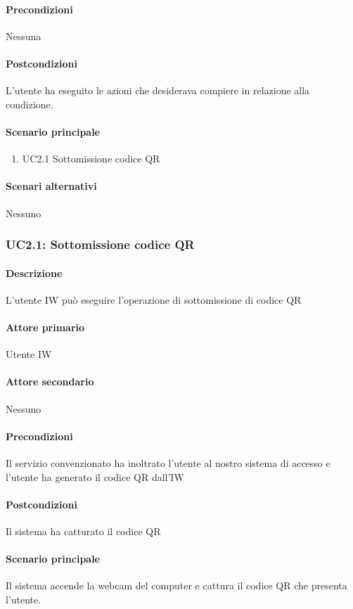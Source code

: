 \paragraph{Precondizioni} Nessuna
\paragraph{Postcondizioni}  L’utente ha eseguito le azioni che desiderava compiere in relazione alla condizione.
\paragraph{Scenario principale}  
    \begin{enumerate}
        \item UC2.1 Sottomissione codice QR
    \end{enumerate}
\paragraph{Scenari alternativi}  Nessuno






\subsubsection{UC2.1: Sottomissione codice QR}
\paragraph{Descrizione}  L’utente IW può eseguire l’operazione di sottomissione di codice QR
\paragraph{Attore primario}  Utente IW
\paragraph{Attore secondario}  Nessuno
\paragraph{Precondizioni} Il servizio convenzionato ha inoltrato l’utente al nostro sistema di accesso e l’utente ha generato il codice QR dall’IW
\paragraph{Postcondizioni} Il sistema ha catturato il codice QR
\paragraph{Scenario principale}  
Il sistema accende la webcam del computer e cattura il codice QR che presenta l’utente.

